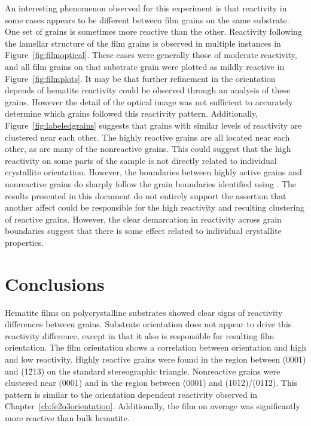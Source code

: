 \documentclass[12pt,%
              twoside,
               letterpaper]{uiothesis}
\begin{document}
An interesting phenomenon observed for this experiment is that reactivity in some cases
appears to be different between film grains on the same substrate. One set of grains is
sometimes more reactive than the other. Reactivity following the lamellar structure of the
film grains is observed in multiple instances in Figure~\ref{fig:filmoptical}. These cases were
generally those of moderate reactivity, and all film grains on that substrate grain were
plotted as mildly reactive in Figure~\ref{fig:filmplots}. It may be that further refinement in
the orientation depends of hematite reactivity could be observed through an analysis of
these grains. However the detail of the optical image was not sufficient to accurately
determine which grains followed this reactivity pattern. Additionally,
Figure~\ref{fig:labeledgrains} suggests that grains with similar levels of
reactivity are clustered near each other. The highly reactive grains are all located near
each other, as are many of the nonreactive grains. This could suggest that the high
reactivity on some parts of the sample is not directly related to individual crystallite
orientation. However, the boundaries between highly active grains and nonreactive grains
do sharply follow the grain boundaries identified using . The results presented
in this document do not entirely support the assertion that another affect could be 
responsible for the high reactivity and resulting clustering of reactive grains. However, 
the clear demarcation in reactivity across grain boundaries suggest that there is some 
effect related to individual crystallite properties.
 



\section{Conclusions}
\label{sec:poly.reac.conclusions}

Hematite films on polycrystalline substrates showed clear signs of reactivity differences
between grains. Substrate orientation does not appear to drive this reactivity difference,
except in that it also is responsible for resulting film orientation. The film orientation
shows a correlation between orientation and high and low reactivity. Highly reactive
grains were found in the region between (0001) and (1\={2}13) on the standard
stereographic triangle. Nonreactive grains were clustered near (0001) and in the region
between (0001) and (10\={1}2)/(01\={1}2). This pattern is similar to the orientation
dependent reactivity observed in Chapter~\ref{ch:fe2o3orientation}. Additionally, the film on
average was significantly more reactive than bulk hematite. 
\end{document}
